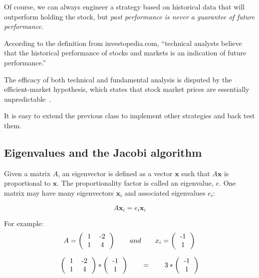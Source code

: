 \documentclass[justified,sixbynine]{tufte-book}
\theoremstyle{plain}%
\theoremstyle{definition}
\theoremstyle{remark}
\begin{document}
\begin{fullwidth}
Of course, we can always engineer a strategy based on historical data that will outperform holding the stock, but {\it past performance is never a guarantee of future performance}.

According to the definition from investopedia.com, ``technical analysts believe that the historical performance of stocks and markets is an indication of future performance.''

The efficacy of both technical and fundamental analysis is disputed by the efficient-market hypothesis, which states that stock market prices are essentially unpredictable~\cite{andrew}.

It is easy to extend the previous class to implement other strategies and back test them.

\goodbreak\subsection{Eigenvalues and the Jacobi algorithm}


Given a matrix $A$, an eigenvector is defined as a vector $\mathbf{x}$ such that
$A\mathbf{x}$ is proportional to $\mathbf{x}$.
The proportionality factor is called an eigenvalue, $e$. One matrix may have many eigenvectors $\mathbf{x}_i$ and associated eigenvalues $e_i$:

\begin{equation}
A\mathbf{x}_i = e_i\mathbf{x}_i
\end{equation}

For example:
\begin{equation}
A = \left(\begin{tabular}{ccc}
1 & -2  \\
1 & 4  \\
\end{tabular}\right) \qquad and \qquad
x_i =
\left(\begin{tabular}{c}
-1 \\
1 \\
\end{tabular}\right)
\end{equation}

\begin{equation}
\left(\begin{tabular}{ccc}
1 & -2  \\
1 & 4  \\
\end{tabular}\right) *
\left(\begin{tabular}{c}
-1 \\
1 \\
\end{tabular}\right) \qquad =  \qquad
3 * \left(\begin{tabular}{c}
-1 \\
1 \\
\end{tabular}\right)
\end{equation}


\end{fullwidth}
\end{document}
